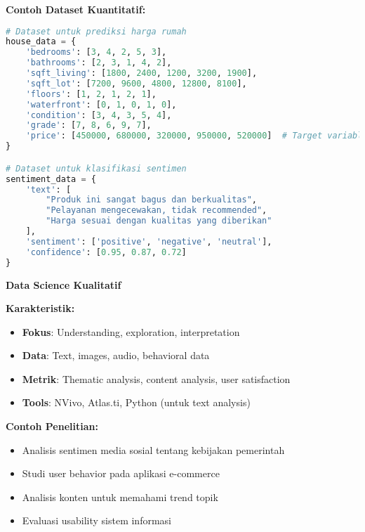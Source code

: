 \textbf{Contoh Dataset Kuantitatif:}
\begin{lstlisting}[language=python, style=python, caption=Dataset Kuantitatif untuk Data Science]
# Dataset untuk prediksi harga rumah
house_data = {
    'bedrooms': [3, 4, 2, 5, 3],
    'bathrooms': [2, 3, 1, 4, 2],
    'sqft_living': [1800, 2400, 1200, 3200, 1900],
    'sqft_lot': [7200, 9600, 4800, 12800, 8100],
    'floors': [1, 2, 1, 2, 1],
    'waterfront': [0, 1, 0, 1, 0],
    'condition': [3, 4, 3, 5, 4],
    'grade': [7, 8, 6, 9, 7],
    'price': [450000, 680000, 320000, 950000, 520000]  # Target variable
}

# Dataset untuk klasifikasi sentimen
sentiment_data = {
    'text': [
        "Produk ini sangat bagus dan berkualitas",
        "Pelayanan mengecewakan, tidak recommended",
        "Harga sesuai dengan kualitas yang diberikan"
    ],
    'sentiment': ['positive', 'negative', 'neutral'],
    'confidence': [0.95, 0.87, 0.72]
}
\end{lstlisting}

\textbf{Data Science Kualitatif}

\textbf{Karakteristik:}
\begin{itemize}
    \item \textbf{Fokus}: Understanding, exploration, interpretation
    \item \textbf{Data}: Text, images, audio, behavioral data
    \item \textbf{Metrik}: Thematic analysis, content analysis, user satisfaction
    \item \textbf{Tools}: NVivo, Atlas.ti, Python (untuk text analysis)
\end{itemize}

\textbf{Contoh Penelitian:}
\begin{itemize}
    \item Analisis sentimen media sosial tentang kebijakan pemerintah
    \item Studi user behavior pada aplikasi e-commerce
    \item Analisis konten untuk memahami trend topik
    \item Evaluasi usability sistem informasi
\end{itemize}


